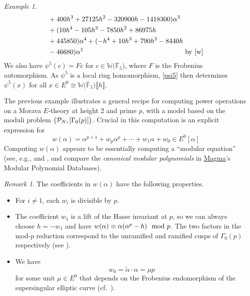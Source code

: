 \documentclass{gtpart}
\theoremstyle{definition}
\theoremstyle{remark}
\newtheorem{rmk}[equation]{Remark}
\newtheorem{ex}[equation]{Example}
\newcommand{\mb}[1]{\mathbb{#1}}
\newcommand{\cF}{\overline {\mb F}}
\newcommand{\CP}{{\cal P}}
\newcommand{\BW}{{\mb W}}
\newcommand{\md}{~~{\rm mod}~}
\newcommand{\A}{\alpha}
\newcommand{\G}{\Gamma}
\newcommand{\lb}{\llbracket}
\newcommand{\rb}{\rrbracket}
\renewcommand{\=}{\approx}
\renewcommand{\-}{\sim}
\numberwithin{equation}{section}
\begin{document}
\begin{ex}
\begin{equation}
\begin{split}
               & + 400 h^3 + 27125 h^2 - 320900 h - 1418300) \A^3 \\
               & + (10 h^4 - 105 h^3 - 7850 h^2 + 86975 h \\
               & + 445850) \A^4 + (-h^4 + 10 h^3 + 790 h^2 - 8440 h \\
               & - 46680) \A^5 
                 \qquad\qquad\qquad\qquad\qquad\qquad\qquad~~~ 
                 \text{by \eqref{w}} 
  \end{split}
 \end{equation}
 We also have $\psi^5(c) = F c$ for $c \in \BW \big( \cF_5 \big)$, where $F$ is 
 the Frobenius automorphism.  As $\psi^5$ is a local ring homomorphism, 
 \eqref{psi5} then determines $\psi^5(x)$ for all 
 $x \in E^0 \cong \BW \big( \cF_5 \big) \lb h \rb$.  
\end{ex}

The previous example illustrates a general recipe for computing power operations 
on a Morava $E$-theory at height 2 and prime $p$, with a model based on the 
moduli problem $\big(\CP_N,[\G_0(p)]\big)$.  Crucial in this computation is an 
explicit expression for 
\begin{equation}
 \label{generalw}
 w(\A) = \A^{p + 1} + w_p \A^p + \cdots + w_1 \A + w_0 \in E^0[\A] 
\end{equation}
Computing $w(\A)$ appears to be essentially computing a ``modular equation'' 
(see, e.g., \cite[II.6]{Milne} and \cite{MO}, and compare the {\em canonical 
modular polynomials} in 
\href{http://magma.maths.usyd.edu.au/magma/handbook/modular_curves}{Magma}'s 
Modular Polynomial Databases).  

\begin{rmk}
 The coefficients in $w(\A)$ have the following properties.  
 \begin{itemize}
  \item For $i \neq 1$, each $w_i$ is divisible by $p$.  

  \item The coefficient $w_1$ is a lift of the Hasse invariant at $p$, so we can 
  always choose $h = -w_1$ and have $w(\A) \equiv \A (\A^p - h) \md p$.  The two 
  factors in the mod-$p$ reduction correspond to the unramified and ramified 
  cusps of $\G_0(p)$ respectively (see \cite[Section 1.13]{padicprop}).  

  \item We have 
  \begin{equation}
   \label{w0}
   w_0 = \widetilde{\A} \cdot \A = \mu p 
  \end{equation}
  for some unit $\mu \in E^0$ that depends on the Frobenius endomorphism of the 
  supersingular elliptic curve (cf.~\cite[3.8]{mc1}).  
 \end{itemize}
\end{rmk}
\end{document}
